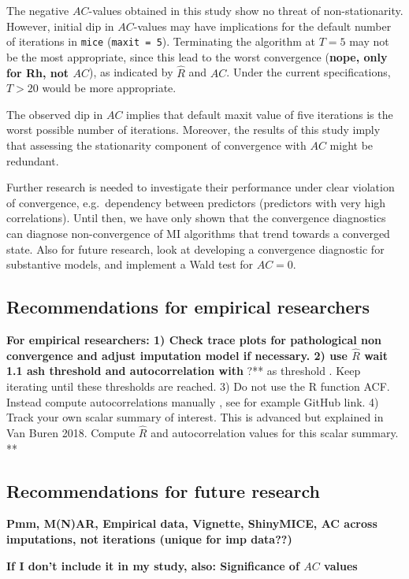 \documentclass[Royal,times,sageh]{sagej}
\begin{document}
The negative \(AC\)-values obtained in this study show no threat of
non-stationarity. However, initial dip in \(AC\)-values may have
implications for the default number of iterations in \texttt{mice}
(\texttt{maxit\ =\ 5}). Terminating the algorithm at \(T=5\) may not be
the most appropriate, since this lead to the worst convergence
(\textbf{nope, only for Rh, not \(AC\)}), as indicated by
\(\widehat{R}\) and \(AC\). Under the current specifications, \(T>20\)
would be more appropriate.

The observed dip in \(AC\) implies that default maxit value of five
iterations is the worst possible number of iterations. Moreover, the
results of this study imply that assessing the stationarity component of
convergence with \(AC\) might be redundant.

Further research is needed to investigate their performance under clear
violation of convergence, e.g.~dependency between predictors (predictors
with very high correlations). Until then, we have only shown that the
convergence diagnostics can diagnose non-convergence of MI algorithms
that trend towards a converged state. Also for future research, look at
developing a convergence diagnostic for substantive models, and
implement a Wald test for \(AC = 0\).

\hypertarget{recommendations-for-empirical-researchers}{%
\subsection{Recommendations for empirical
researchers}\label{recommendations-for-empirical-researchers}}

\textbf{For empirical researchers: 1) Check trace plots for pathological
non convergence and adjust imputation model if necessary. 2) use
\(\widehat{R}\) wait 1.1 ash threshold and autocorrelation with }?** as
threshold . Keep iterating until these thresholds are reached. 3) Do not
use the R function ACF. Instead compute autocorrelations manually , see
for example GitHub link. 4) Track your own scalar summary of interest.
This is advanced but explained in Van Buren 2018. Compute
\(\widehat{R}\) and autocorrelation values for this scalar summary. **

\hypertarget{recommendations-for-future-research}{%
\subsection{Recommendations for future
research}\label{recommendations-for-future-research}}

\textbf{Pmm, M(N)AR, Empirical data, Vignette, ShinyMICE, AC across
imputations, not iterations (unique for imp data??)}

\textbf{If I don't include it in my study, also: Significance of \(AC\)
values}



\end{document}
